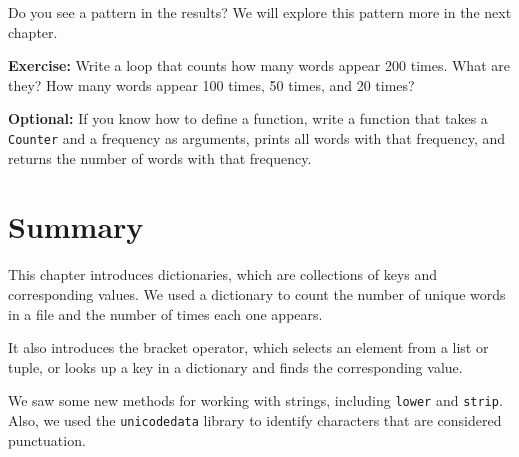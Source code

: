 Do you see a pattern in the results? We will explore this pattern more
in the next chapter.

\textbf{Exercise:} Write a loop that counts how many words appear 200
times. What are they? How many words appear 100 times, 50 times, and 20
times?

\textbf{Optional:} If you know how to define a function, write a
function that takes a \passthrough{\lstinline!Counter!} and a frequency
as arguments, prints all words with that frequency, and returns the
number of words with that frequency.

\section{Summary}\label{summary}

This chapter introduces dictionaries, which are collections of keys and
corresponding values. We used a dictionary to count the number of unique
words in a file and the number of times each one appears.

It also introduces the bracket operator, which selects an element from a
list or tuple, or looks up a key in a dictionary and finds the
corresponding value.

We saw some new methods for working with strings, including
\passthrough{\lstinline!lower!} and \passthrough{\lstinline!strip!}.
Also, we used the \passthrough{\lstinline!unicodedata!} library to
identify characters that are considered punctuation.
